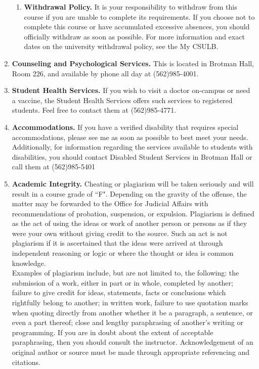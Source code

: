 \documentclass[9pt]{article}
\begin{document}
\begin{enumerate}
\begin{enumerate}
   \item \textbf{Withdrawal Policy.} It is your responsibility to withdraw from
         this course if you are unable to complete its requirements. If you
         choose not to complete this course or have accumulated excessive
         absences, you should officially withdraw as soon as possible. For more
         information and exact dates on the university withdrawal policy, see
         the My CSULB.
         \end{enumerate}
   \item \textbf{Counseling and Psychological Services.} This is located in
         Brotman Hall, Room 226, and available by phone all day at (562)985-4001.
   \item \textbf{Student Health Services.} If you wish to visit a doctor
         on-campus or need a vaccine, the Student Health Services offers such
         services to registered students. Feel free to contact them at
         (562)985-4771.
   \item \textbf{Accommodations.} If you have a verified disability that
         requires special accommodations, please see me as soon as possible
         to best meet your needs. Additionally, for information regarding the
         services available to students with disabilities, you should
         contact Disabled Student Services in Brotman Hall or call them at
         (562)985-5401
   \item \textbf{Academic Integrity.} Cheating or plagiarism will be taken 
         seriously and will result in a course grade of ``F". Depending on the
         gravity of the offense, the matter may be forwarded to the Office for
         Judicial Affairs with recommendations of probation, suspension, or
         expulsion. Plagiarism is defined as the act of using the ideas or work
         of another person or persons as if they were your own without giving
         credit to the source. Such an act is not plagiarism if it is
         ascertained that the ideas were arrived at through independent
         reasoning or logic or where the thought or idea is common knowledge. \\
         
         Examples of plagiarism include, but are not limited to, the following:
         the submission of a work, either in part or in whole, completed by
         another; failure to give credit for ideas, statements, facts or
         conclusions which rightfully belong to another; in written work,
         failure to use quotation marks when quoting directly from another
         whether it be a paragraph, a sentence, or even a part thereof; close
         and lengthy paraphrasing of another's writing or programming. If you
         are in doubt about the extent of acceptable paraphrasing, then you
         should consult the instructor. Acknowledgement of an original author or
         source must be made through appropriate referencing and citations.
         

\end{enumerate}
\end{document}
